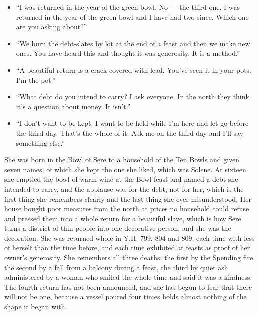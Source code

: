 \documentclass{design/chronicle}
\begin{document}
{\begin{itemize}[leftmargin=1.4em,itemsep=1pt,topsep=3pt,parsep=0pt]

\item “I was returned in the year of the green bowl. No — the third one. I was returned in the year of the green bowl and I have had two since. Which one are you asking about?”

\item “We burn the debt-slates by lot at the end of a feast and then we make new ones. You have heard this and thought it was generosity. It is a method.”

\item “A beautiful return is a crack covered with lead. You’ve seen it in your pots. I’m the pot.”

\item “What debt do you intend to carry? I ask everyone. In the north they think it’s a question about money. It isn’t.”

\item “I don’t want to be kept. I want to be held while I’m here and let go before the third day. That’s the whole of it. Ask me on the third day and I’ll say something else.”

\end{itemize}

She was born in the Bowl of Sere to a household of the Ten Bowls and given seven names, of which she kept the one she liked, which was Solene. At sixteen she emptied the bowl of warm wine at the Bowl feast and named a debt she intended to carry, and the applause was for the debt, not for her, which is the first thing she remembers clearly and the last thing she ever misunderstood. Her house bought poor measures from the north at prices no household could refuse and pressed them into a whole return for a beautiful slave, which is how Sere turns a district of thin people into one decorative person, and she was the decoration. She was returned whole in Y.H. 799, 804 and 809, each time with less of herself than the time before, and each time exhibited at feasts as proof of her owner’s generosity. She remembers all three deaths: the first by the Spending fire, the second by a fall from a balcony during a feast, the third by quiet ash administered by a woman who smiled the whole time and said it was a kindness. The fourth return has not been announced, and she has begun to fear that there will not be one, because a vessel poured four times holds almost nothing of the shape it began with.

}
\end{document}
